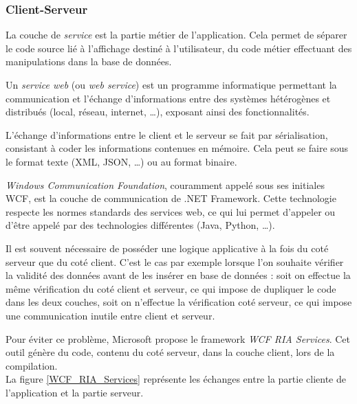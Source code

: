 
\subsubsection{Client-Serveur}

La couche de \textit{service} est la partie métier de l'application. Cela permet de séparer le code source lié à l'affichage destiné à l'utilisateur, du code métier effectuant des manipulations dans la base de données.



Un \textit{service web} (ou \textit{web service}) est un programme informatique permettant la communication et l'échange d'informations entre des systèmes hétérogènes et distribués (local, réseau, internet, \ldots), exposant ainsi des fonctionnalités.

L'échange d'informations entre le client et le serveur se fait par sérialisation, consistant à coder les informations contenues en mémoire. Cela peut se faire sous le format texte (XML, JSON, \ldots) ou au format binaire.



\textit{Windows Communication Foundation}, couramment appelé sous ses initiales WCF, est la couche de communication de .NET Framework. Cette technologie respecte les normes standards des services web, ce qui lui permet d'appeler ou d'être appelé par des technologies différentes (Java, Python, \ldots).



Il est souvent nécessaire de posséder une logique applicative à la fois du coté serveur que du coté client. C'est le cas par exemple lorsque l'on souhaite vérifier la validité des données avant de les insérer en base de données : soit on effectue la même vérification du coté client et serveur, ce qui impose de dupliquer le code dans les deux couches, soit on n'effectue la vérification coté serveur, ce qui impose une communication inutile entre client et serveur.

Pour éviter ce problème, Microsoft propose le framework \textit{WCF RIA Services}. Cet outil génère du code, contenu du coté serveur, dans la couche client, lors de la compilation.
\\


La figure \ref{WCF_RIA_Services} représente les échanges entre la partie cliente de l'application et la partie serveur.

